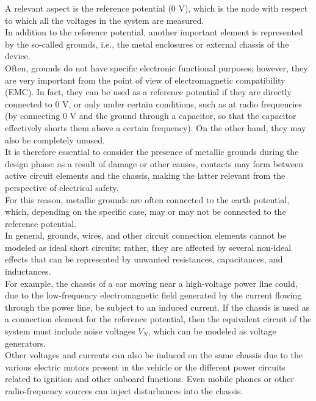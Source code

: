 \documentclass[../main.tex]{subfiles}
\begin{document}
A relevant aspect is the reference potential (0 V), which is the node with respect to which all the voltages in the system are measured.\\


In addition to the reference potential, another important element is represented by the so-called grounds, i.e., the metal enclosures or external chassis of the device.\\

Often, grounds do not have specific electronic functional purposes; however, they are very important from the point of view of electromagnetic compatibility (EMC). In fact, they can be used as a reference potential if they are directly connected to 0 V, or only under certain conditions, such as at radio frequencies (by connecting 0 V and the ground through a capacitor, so that the capacitor effectively shorts them above a certain frequency). On the other hand, they may also be completely unused.\\

It is therefore essential to consider the presence of metallic grounds during the design phase: as a result of damage or other causes, contacts may form between active circuit elements and the chassis, making the latter relevant from the perspective of electrical safety.\\ 

For this reason, metallic grounds are often connected to the earth potential, which, depending on the specific case, may or may not be connected to the reference potential.\\

In general, grounds, wires, and other circuit connection elements cannot be modeled as ideal short circuits; rather, they are affected by several non-ideal effects that can be represented by unwanted resistances, capacitances, and inductances.\\

For example, the chassis of a car moving near a high-voltage power line could, due to the low-frequency electromagnetic field generated by the current flowing through the power line, be subject to an induced current. If the chassis is used as a connection element for the reference potential, then the equivalent circuit of the system must include noise voltages $V_N$, which can be modeled as voltage generators.\\

Other voltages and currents can also be induced on the same chassis due to the various electric motors present in the vehicle or the different power circuits related to ignition and other onboard functions. Even mobile phones or other radio-frequency sources can inject disturbances into the chassis.\\
\end{document}
